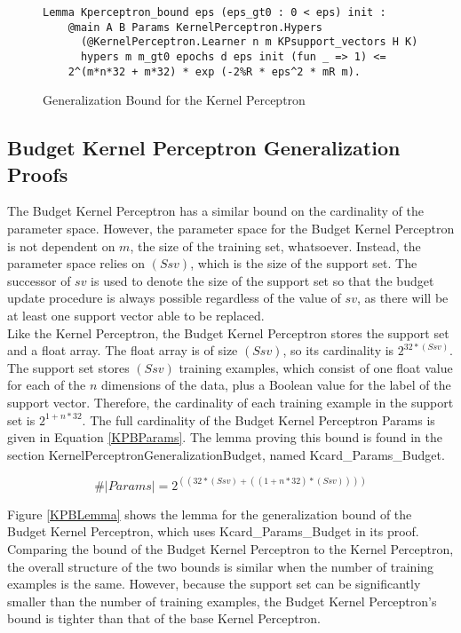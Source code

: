 \begin{figure}
    \caption{Generalization Bound for the Kernel Perceptron}
    \label{KPLemma}
    \begin{lstlisting}
Lemma Kperceptron_bound eps (eps_gt0 : 0 < eps) init : 
    @main A B Params KernelPerceptron.Hypers 
      (@KernelPerceptron.Learner n m KPsupport_vectors H K)
      hypers m m_gt0 epochs d eps init (fun _ => 1) <=
    2^(m*n*32 + m*32) * exp (-2%R * eps^2 * mR m).
    \end{lstlisting}
\end{figure}

\subsection{Budget Kernel Perceptron Generalization Proofs}\label{KPBProofs}
The Budget Kernel Perceptron has a similar bound on the cardinality of the parameter space. However, the parameter space for the Budget Kernel Perceptron is not dependent on $m$, the size of the training set, whatsoever. Instead, the parameter space relies on $(S sv)$, which is the size of the support set. The successor of $sv$ is used to denote the size of the support set so that the budget update procedure is always possible regardless of the value of $sv$, as there will be at least one support vector able to be replaced.
\\Like the Kernel Perceptron, the Budget Kernel Perceptron stores the support set and a float array. The float array is of size $(S sv)$, so its cardinality is $2^{32 * (S sv)}$. The support set stores $(S sv)$ training examples, which consist of one float value for each of the $n$ dimensions of the data, plus a Boolean value for the label of the support vector. Therefore, the cardinality of each training example in the support set is $2^{1 + n * 32}$. The full cardinality of the Budget Kernel Perceptron Params is given in Equation \ref{KPBParams}. The lemma proving this bound is found in the section KernelPerceptronGeneralizationBudget, named Kcard\_Params\_Budget.

\begin{equation} \label{KPBParams}
 \#|Params| = 2^{((32*(S sv) + ((1 + n * 32)*(S sv))))}
\end{equation}

Figure \ref{KPBLemma} shows the lemma for the generalization bound of the Budget Kernel Perceptron, which uses Kcard\_Params\_Budget in its proof. Comparing the bound of the Budget Kernel Perceptron to the Kernel Perceptron, the overall structure of the two bounds is similar when the number of training examples is the same. However, because the support set can be significantly smaller than the number of training examples, the Budget Kernel Perceptron's bound is tighter than that of the base Kernel Perceptron. 

